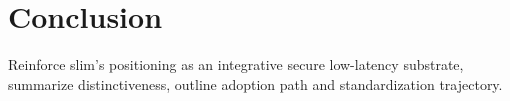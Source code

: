 \documentclass{article}
\theoremstyle{definition}
\theoremstyle{remark}
\begin{document}
\section{Conclusion}\label{sec:conclusion}
Reinforce \gls{slim}'s positioning as an integrative secure low-latency substrate, summarize distinctiveness, outline adoption path and standardization trajectory.

\printglossaries



\end{document}
